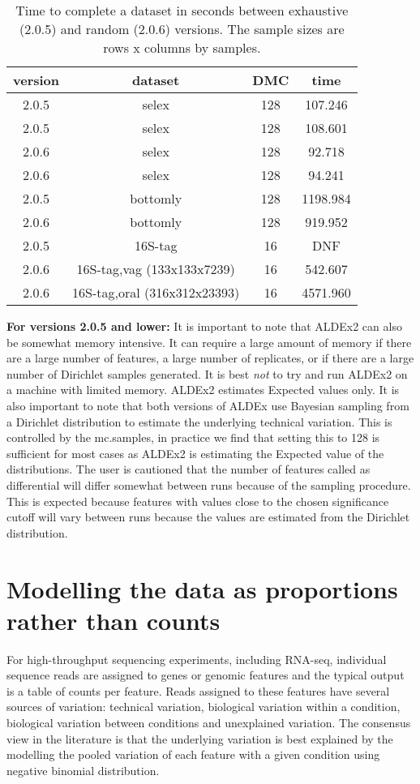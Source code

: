 \documentclass[11pt]{amsart}
\begin{document}
\begin{table}
\caption{Time to complete a dataset in seconds between exhaustive (2.0.5) and random (2.0.6) versions. The sample sizes are rows x columns by samples.}
\begin{tabular}{cccc}

version & dataset & DMC  &  time\\\hline
2.0.5  &  selex  &  128  &  107.246\\
2.0.5  &  selex  &  128  &  108.601\\
2.0.6  &  selex  &  128  &  92.718\\
2.0.6  &  selex  &  128  &  94.241\\
2.0.5  &  bottomly  &  128  &  1198.984   \\
2.0.6  &  bottomly  &  128  &  919.952\\
2.0.5  &  16S-tag  &  16  &  DNF\\
2.0.6  &  16S-tag,vag (133x133x7239)  &  16  &  542.607\\
2.0.6  &  16S-tag,oral (316x312x23393)  &  16  &  4571.960\\
\end{tabular}
\label{exvsra}

\end{table}

\textbf{For versions 2.0.5 and lower:} It is important to note that ALDEx2 can also be somewhat memory intensive. It can require a large amount of memory if there are a large number of features, a large number of replicates, or if there are a large number of Dirichlet samples generated. It is best \emph{not} to try and run ALDEx2 on a machine with limited memory. ALDEx2 estimates Expected values only. It is also important to note that both versions of ALDEx use Bayesian sampling from a Dirichlet distribution to estimate  the underlying technical variation. This is controlled by the mc.samples, in practice we find that setting this to 128 is sufficient for most cases as ALDEx2 is estimating the Expected value of the distributions. The user is cautioned that the number of features called as differential will differ somewhat between runs because of the sampling procedure. This is expected because features with values close to the chosen significance cutoff will vary between runs because the values are estimated from the Dirichlet distribution. 


\section{Modelling the data as proportions rather than counts}
For high-throughput sequencing experiments, including RNA-seq, individual sequence reads are assigned to genes or genomic features and the typical output is a table of counts per feature. Reads assigned to these features have several sources of variation: technical variation, biological variation within a condition, biological variation between conditions and unexplained variation. The consensus view in the literature is that the underlying variation is best explained by the modelling the pooled variation of each feature with a given condition using negative binomial distribution. 
\end{document}
